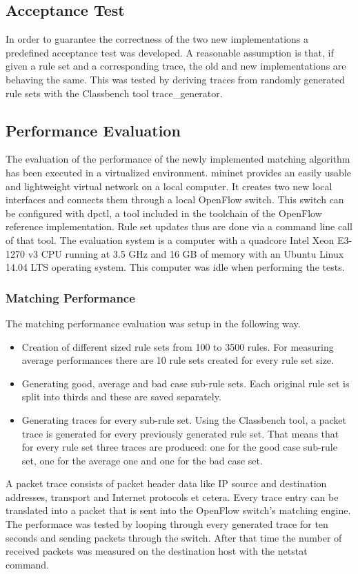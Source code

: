 \documentclass[a4paper,
		12pt,
		parskip=full,
		titlepage
		]{scrartcl}
\begin{document}
\subsection{Acceptance Test}
In order to guarantee the correctness of the two new implementations a predefined acceptance test was developed.
A reasonable assumption is that, if given a rule set and a corresponding trace, the old and new implementations are behaving the same.
This was tested by deriving traces from randomly generated rule sets with the Classbench\cite{classbench_website} tool \textsf{trace\_generator}.

\subsection{Performance Evaluation}
The evaluation of the performance of the newly implemented matching algorithm has been executed in a virtualized environment.
\textsf{mininet}\cite{mininet} provides an easily usable and lightweight virtual network on a local computer.
It creates two new local interfaces and connects them through a local OpenFlow switch.
This switch can be configured with \textsf{dpctl}, a tool included in the toolchain of the OpenFlow reference implementation.
Rule set updates thus are done via a command line call of that tool.
The evaluation system is a computer with a quadcore Intel Xeon E3-1270 v3 CPU 
running at 3.5 GHz and 16 GB of memory with an Ubuntu Linux 14.04 LTS operating system.
This computer was idle when performing the tests.

\subsubsection{Matching Performance}
The matching performance evaluation was setup in the following way.
\begin{itemize}
    \item Creation of different sized rule sets from 100 to 3500 rules.
        For measuring average performances there are 10 rule sets created for every rule set size.
    \item Generating good, average and bad case sub-rule sets. 
        Each original rule set is split into thirds and these are saved separately.
    \item Generating traces for every sub-rule set.
        Using the Classbench\cite{classbench_website} tool, a packet trace is generated for every previously generated rule set.
        That means that for every rule set three traces are produced: 
        one for the good case sub-rule set, one for the average one and one for the bad case set.
\end{itemize}
A packet trace consists of packet header data like IP source and destination addresses, transport and Internet protocols et cetera.
Every trace entry can be translated into a packet that is sent into the OpenFlow switch's matching engine.
The performace was tested by looping through every generated trace for ten seconds and sending packets through the switch.
After that time the number of received packets was measured on the destination host with the \textsf{netstat} command.
\end{document}

